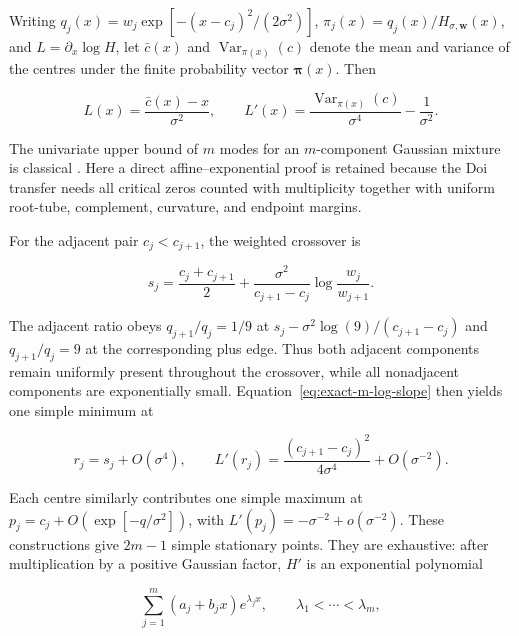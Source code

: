 \documentclass{iopjournal}
\theoremstyle{plain}
\theoremstyle{definition}
\begin{document}
Writing $q_j(x)=w_j\exp[-(x-c_j)^2/(2\sigma^2)]$,
$\pi_j(x)=q_j(x)/H_{\sigma,\bm w}(x)$, and
$L=\partial_x\log H$, let $\bar c(x)$ and
$\operatorname{Var}_{\pi(x)}(c)$ denote the mean and variance of the centres
under the finite probability vector $\bm\pi(x)$.  Then

\begin{equation}
 L(x)=\frac{\bar c(x)-x}{\sigma^2},
 \qquad
 L'(x)=\frac{\operatorname{Var}_{\pi(x)}(c)}{\sigma^4}
       -\frac{1}{\sigma^2}.
 \label{eq:exact-m-log-slope}
\end{equation}

The univariate upper bound of $m$ modes for an $m$-component Gaussian mixture
is classical \cite{carreiraPerpinanWilliams2003modes,
amendolaEngstromHaase2020modes}.  Here a direct affine--exponential proof is
retained because the Doi transfer needs all critical zeros counted with
multiplicity together with uniform root-tube, complement, curvature, and
endpoint margins.

For the adjacent pair $c_j<c_{j+1}$, the weighted crossover is

\begin{equation}
 s_j=\frac{c_j+c_{j+1}}{2}
 +\frac{\sigma^2}{c_{j+1}-c_j}
  \log\!\frac{w_j}{w_{j+1}}.
 \label{eq:exact-m-crossover}
\end{equation}

The adjacent ratio obeys
$q_{j+1}/q_j=1/9$ at
$s_j-\sigma^2\log(9)/(c_{j+1}-c_j)$ and $q_{j+1}/q_j=9$ at the corresponding
plus edge.  Thus both adjacent components remain uniformly present throughout
the crossover, while all nonadjacent components are exponentially small.
Equation~\eqref{eq:exact-m-log-slope} then yields one simple minimum at

\begin{equation}
 r_j=s_j+O(\sigma^4),
 \qquad
 L'(r_j)=\frac{(c_{j+1}-c_j)^2}{4\sigma^4}
          +O(\sigma^{-2}).
 \label{eq:exact-m-valley}
\end{equation}

Each centre similarly contributes one simple maximum at
$p_j=c_j+O(\exp[-q/\sigma^2])$, with
$L'(p_j)=-\sigma^{-2}+o(\sigma^{-2})$.  These constructions give
$2m-1$ simple stationary points.  They are exhaustive: after multiplication
by a positive Gaussian factor, $H'$ is an exponential polynomial

\begin{equation}
 \sum_{j=1}^{m}(a_j+b_jx)e^{\lambda_jx},
 \qquad \lambda_1<\cdots<\lambda_m,
 \label{eq:exact-m-exp-polynomial}
\end{equation}
\end{document}
